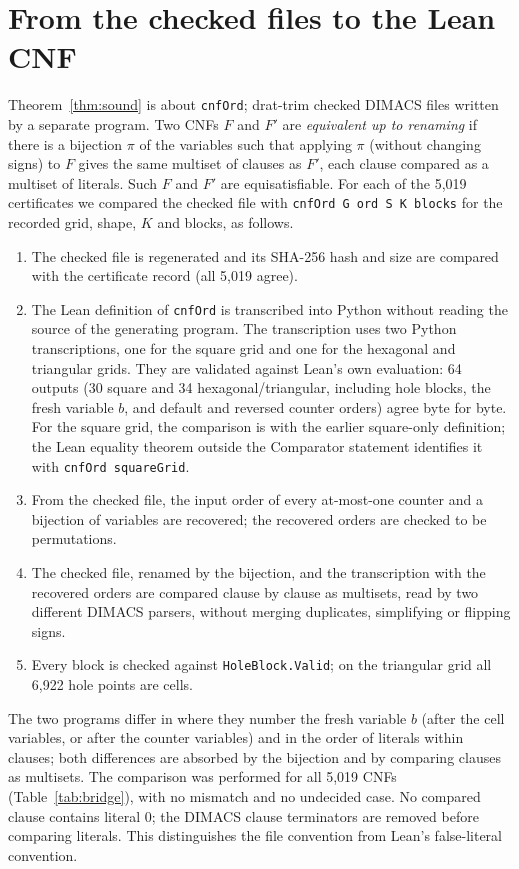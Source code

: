 \documentclass[10pt,a4paper]{article}
\theoremstyle{definition}
\theoremstyle{remark}
\newcommand{\lean}[1]{\texttt{#1}}
\begin{document}
\section{From the checked files to the Lean CNF}
\label{sec:bridge}
Theorem~\ref{thm:sound} is about \lean{cnfOrd}; drat-trim checked DIMACS
files written by a separate program. Two CNFs $F$ and $F'$ are
\emph{equivalent up to renaming} if there is a bijection $\pi$ of the
variables such that applying $\pi$ (without changing signs) to $F$ gives
the same multiset of clauses as $F'$, each clause compared as a multiset
of literals. Such $F$ and $F'$ are equisatisfiable. For each of the 5,019
certificates we compared the checked file with
\lean{cnfOrd G ord S K blocks} for the recorded grid, shape, $K$ and
blocks, as follows.
\begin{enumerate}
\item The checked file is regenerated and its SHA-256 hash and size are
compared with the certificate record (all 5,019 agree).
\item The Lean definition of \lean{cnfOrd} is transcribed into Python
without reading the source of the generating program. The transcription
uses two Python transcriptions, one for the square grid and one for
the hexagonal and triangular grids. They are validated against Lean's
own evaluation: 64 outputs (30 square and 34 hexagonal/triangular,
including hole blocks, the fresh variable $b$, and default and reversed
counter orders) agree byte for byte. For the square grid, the comparison
is with the earlier square-only definition; the Lean equality theorem
outside the Comparator statement identifies it with
\lean{cnfOrd squareGrid}.
\item From the checked file, the input order of every at-most-one counter
and a bijection of variables are recovered; the recovered orders are
checked to be permutations.
\item The checked file, renamed by the bijection, and the transcription
with the recovered orders are compared clause by clause as multisets,
read by two different DIMACS parsers, without merging duplicates,
simplifying or flipping signs.
\item Every block is checked against \lean{HoleBlock.Valid}; on the
triangular grid all 6,922 hole points are cells.
\end{enumerate}
The two programs differ in where they number the fresh variable $b$
(after the cell variables, or after the counter variables) and in the
order of literals within clauses; both differences are absorbed by the
bijection and by comparing clauses as multisets. The comparison was
performed for all 5,019 CNFs (Table~\ref{tab:bridge}), with no mismatch
and no undecided case. No compared clause contains literal $0$;
the DIMACS clause terminators are removed before comparing literals.
This distinguishes the file convention from Lean's false-literal
convention.
\end{document}
